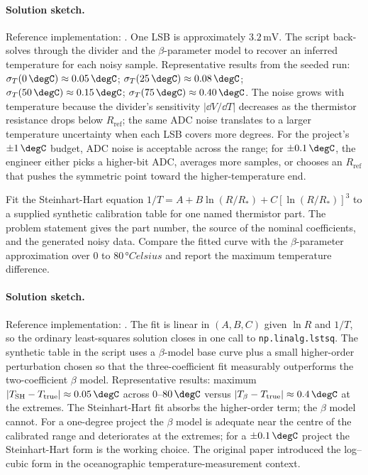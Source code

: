 \paragraph{Solution sketch.} Reference implementation:
. One LSB is approximately
$3.2 \,\si{\milli\volt}$. The script back-solves through the
divider and the $\beta$-parameter model to recover an inferred
temperature for each noisy sample. Representative results from the
seeded run: $\sigma_{T}(0 \,\degC) \approx 0.05 \,\degC$;
$\sigma_{T}(25 \,\degC) \approx 0.08 \,\degC$;
$\sigma_{T}(50 \,\degC) \approx 0.15 \,\degC$;
$\sigma_{T}(75 \,\degC) \approx 0.40 \,\degC$. The noise grows
with temperature because the divider's sensitivity
$|\dd V/\dd T|$ decreases as the thermistor resistance drops
below $R_{\text{ref}}$; the same ADC noise translates to a larger
temperature uncertainty when each LSB covers more degrees. For the
project's $\pm 1 \,\degC$ budget, ADC noise is acceptable across
the range; for $\pm 0.1 \,\degC$, the engineer either picks a
higher-bit ADC, averages more samples, or chooses an
$R_{\text{ref}}$ that pushes the symmetric point toward the
higher-temperature end.

\begin{exercise}
Fit the Steinhart-Hart equation $1/T = A + B \ln(R/R_{\ast}) +
C [\ln(R/R_{\ast})]^{3}$ to a supplied synthetic calibration table
for one named thermistor part. The problem statement gives the part
number, the source of the nominal coefficients, and the generated
noisy data. Compare the fitted curve with the
$\beta$-parameter approximation over $0$ to $80 \,\si{\degree
Celsius}$ and report the maximum temperature difference.
\end{exercise}

\paragraph{Solution sketch.} Reference implementation:
. The fit is linear in
$(A, B, C)$ given $\ln R$ and $1/T$, so the ordinary
least-squares solution closes in one call to
\verb|np.linalg.lstsq|. The synthetic table in the script uses a
$\beta$-model base curve plus a small higher-order perturbation
chosen so that the three-coefficient fit measurably outperforms
the two-coefficient $\beta$ model. Representative results:
maximum $|T_{\text{SH}} - T_{\text{true}}| \approx 0.05 \,\degC$
across $0$--$80 \,\degC$ versus
$|T_{\beta} - T_{\text{true}}| \approx 0.4 \,\degC$ at the
extremes. The Steinhart-Hart fit absorbs the higher-order term;
the $\beta$ model cannot. For a one-degree project the $\beta$
model is adequate near the centre of the calibrated range and
deteriorates at the extremes; for a $\pm 0.1 \,\degC$ project the
Steinhart-Hart form is the working choice. The original paper
\cite{paper:ch05-steinhart-hart-1968} introduced the
log--cubic form in the oceanographic temperature-measurement
context.

